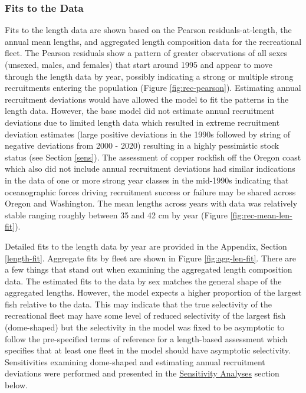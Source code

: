 \documentclass[11pt,
  english,
  a4paper,
]{article}
\begin{document}
\leavevmode\tagmcend\tagstructend\par


\hypertarget{fits-to-the-data}{%
\subsubsection{Fits to the Data}\label{fits-to-the-data}}

\leavevmode\tagmcend\tagstructend


Fits to the length data are shown based on the Pearson residuals-at-length, the annual mean lengths, and aggregated length composition data for the recreational fleet. The Pearson residuals show a pattern of greater observations of all sexes (unsexed, males, and females) that start around 1995 and appear to move through the length data by year, possibly indicating a strong or multiple strong recruitments entering the population (Figure \ref{fig:rec-pearson}). Estimating annual recruitment deviations would have allowed the model to fit the patterns in the length data. However, the base model did not estimate annual recruitment deviations due to limited length data which resulted in extreme recruitment deviation estimates (large positive deviations in the 1990s followed by string of negative deviations from 2000 - 2020) resulting in a highly pessimistic stock status (see Section \ref{sens}). The assessment of copper rockfish off the Oregon coast which also did not include annual recruitment deviations had similar indications in the data of one or more strong year classes in the mid-1990s indicating that oceanographic forces driving recruitment success or failure may be shared across Oregon and Washington. The mean lengths across years with data was relatively stable ranging roughly between 35 and 42 cm by year (Figure \ref{fig:rec-mean-len-fit}).

\leavevmode\tagmcend\tagstructend\par


Detailed fits to the length data by year are provided in the Appendix, Section \ref{length-fit}. Aggregate fits by fleet are shown in Figure \ref{fig:agg-len-fit}. There are a few things that stand out when examining the aggregated length composition data. The estimated fits to the data by sex matches the general shape of the aggregated lengths. However, the model expects a higher proportion of the largest fish relative to the data. This may indicate that the true selectivity of the recreational fleet may have some level of reduced selectivity of the largest fish (dome-shaped) but the selectivity in the model was fixed to be asymptotic to follow the pre-specified terms of reference for a length-based assessment which specifies that at least one fleet in the model should have asymptotic selectivity. Sensitivities examining dome-shaped and estimating annual recruitment deviations were performed and presented in the {\protect\hyperlink{sensitivity-analyses}{Sensitivity Analyses}\leavevmode\tagmcend\tagstructend} section below.
\end{document}
